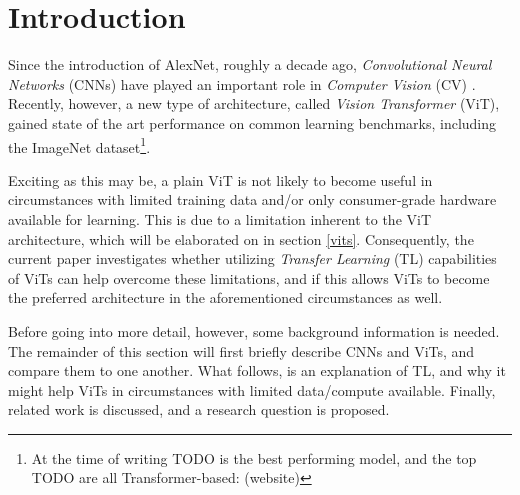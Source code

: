 \section{Introduction}
Since the introduction of AlexNet, roughly a decade ago, \textit{Convolutional Neural Networks} (CNNs) have played an important role in \textit{Computer Vision} (CV) \citep{krizhevsky2012imagened}. Recently, however, a new type of architecture, called \textit{Vision Transformer} (ViT), gained state of the art performance on common learning benchmarks, including the ImageNet dataset\footnote{At the time of writing TODO is the best performing model, and the top TODO are all Transformer-based: (website)}.

Exciting as this may be, a plain ViT is not likely to become useful in circumstances with limited training data and/or only consumer-grade hardware available for learning. This is due to a limitation inherent to the ViT architecture, which will be elaborated on in section \ref{vits}. Consequently, the current paper investigates whether utilizing \textit{Transfer Learning} (TL) capabilities of ViTs can help overcome these limitations, and if this allows ViTs to become the preferred architecture in the aforementioned circumstances as well.

Before going into more detail, however, some background information is needed. The remainder of this section will first briefly describe CNNs and ViTs, and compare them to one another. What follows, is an explanation of TL, and why it might help ViTs in circumstances with limited data/compute available. Finally, related work is discussed, and a research question is proposed.


